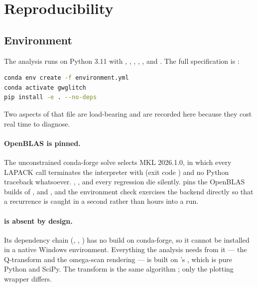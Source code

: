 ﻿\section{Reproducibility}
\label{app:reproducibility}

\subsection{Environment}

The analysis runs on Python 3.11 with , , ,
, ,  and
. The full specification is
:

\begin{lstlisting}[language=bash]
conda env create -f environment.yml
conda activate gwglitch
pip install -e . --no-deps
\end{lstlisting}

Two aspects of that file are load-bearing and are recorded here because they
cost real time to diagnose.

\paragraph{OpenBLAS is pinned.} The unconstrained conda-forge solve selects
MKL 2026.1.0, in which every LAPACK call terminates the interpreter with
 (exit code ) and no
Python traceback whatsoever. ,
,  and every
 regression die silently.  pins the
OpenBLAS builds of ,  and , and
the environment check exercises the backend directly so that a recurrence is
caught in a second rather than hours into a run.

\paragraph{ is absent by design.} Its dependency chain
(, , ) has no 
build on conda-forge, so it cannot be installed in a native Windows
environment. Everything the analysis needs from it --- the Q-transform and the
omega-scan rendering --- is built on 's , which
is pure Python and SciPy. The transform is the same algorithm
\citep{Chatterji2004}; only the plotting wrapper differs.

